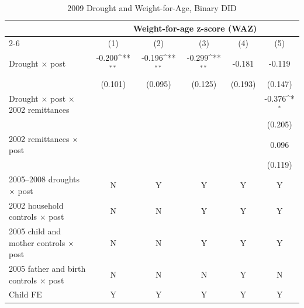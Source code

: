 \documentclass[12pt]{article}
\def\sym#1{\ifmmode^{#1}\else\(^{#1}\)\fi}
\begin{document}
\endgroup
\clearpage
\begingroup
\footnotesize
\renewcommand{\arraystretch}{0.86}
\setlength{\tabcolsep}{4pt}
\setlength{\LTcapwidth}{\textwidth}
\begin{longtable}{l*{5}{c}}
\caption{2009 Drought and Weight-for-Age, Binary DID}\\
\toprule
 & \multicolumn{5}{c}{Weight-for-age z-score (WAZ)}\\
\cmidrule(lr){2-6}
            &\multicolumn{1}{c}{(1)}         &\multicolumn{1}{c}{(2)}         &\multicolumn{1}{c}{(3)}         &\multicolumn{1}{c}{(4)}         &\multicolumn{1}{c}{(5)}         \\
\midrule
Drought \ensuremath{\times} post&      -0.200\sym{**} &      -0.196\sym{**} &      -0.299\sym{**} &      -0.181         &      -0.119         \\
            &     (0.101)         &     (0.095)         &     (0.125)         &     (0.193)         &     (0.147)         \\
Drought \ensuremath{\times} post \ensuremath{\times} 2002 remittances&                     &                     &                     &                     &      -0.376\sym{*}  \\
            &                     &                     &                     &                     &     (0.205)         \\
2002 remittances \ensuremath{\times} post&                     &                     &                     &                     &       0.096         \\
            &                     &                     &                     &                     &     (0.119)         \\
\midrule
2005--2008 droughts \ensuremath{\times} post&           N         &           Y         &           Y         &           Y         &           Y         \\
2002 household controls \ensuremath{\times} post&           N         &           N         &           Y         &           Y         &           Y         \\
2005 child and mother controls \ensuremath{\times} post&           N         &           N         &           Y         &           Y         &           Y         \\
2005 father and birth controls \ensuremath{\times} post&           N         &           N         &           N         &           Y         &           N         \\
Child FE    &           Y         &           Y         &           Y         &           Y         &           Y         \\

\end{longtable}
\end{document}
